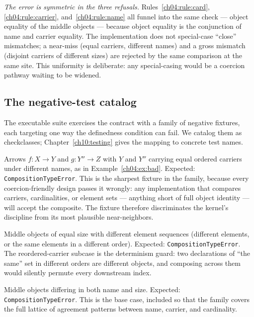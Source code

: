 \emph{The error is symmetric in the three refusals.}
Rules~\ref{ch04:rule:card}, \ref{ch04:rule:carrier},
and~\ref{ch04:rule:name} all funnel into the same check --- object equality
of the middle objects --- because object equality is the conjunction of name
and carrier equality. The implementation does not special-case ``close''
mismatches; a near-miss (equal carriers, different names) and a gross
mismatch (disjoint carriers of different sizes) are rejected by the same
comparison at the same site. This uniformity is deliberate: any
special-casing would be a coercion pathway waiting to be widened.

\subsection{The negative-test catalog}

The executable suite exercises the contract with a family of negative
fixtures, each targeting one way the definedness condition can fail. We
catalog them as checkclasses; Chapter~\ref{ch10:testing} gives the mapping to
concrete test names.

\begin{checkclass}
\label{ch04:check:nameonly}
Arrows $f : X \to Y$ and $g : Y'' \to Z$ with $Y$ and $Y''$ carrying equal
ordered carriers under different names, as in Example~\ref{ch04:ex:bad}.
Expected: \texttt{CompositionTypeError}. This is the sharpest fixture in the
family, because every coercion-friendly design passes it wrongly: any
implementation that compares carriers, cardinalities, or element sets ---
anything short of full object identity --- will accept the composite. The
fixture therefore discriminates the kernel's discipline from its most
plausible near-neighbors.
\end{checkclass}

\begin{checkclass}
\label{ch04:check:cardonly}
Middle objects of equal size with different element sequences (different
elements, or the same elements in a different order). Expected:
\texttt{CompositionTypeError}. The reordered-carrier subcase is the
determinism guard: two declarations of ``the same'' set in different orders
are different objects, and composing across them would silently permute
every downstream index.
\end{checkclass}

\begin{checkclass}
\label{ch04:check:gross}
Middle objects differing in both name and size. Expected:
\texttt{CompositionTypeError}. This is the base case, included so that the
family covers the full lattice of agreement patterns between name, carrier,
and cardinality.
\end{checkclass}

